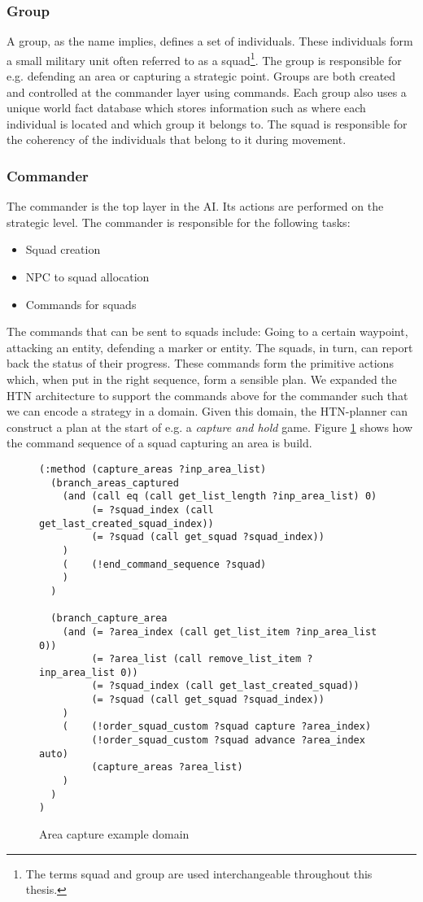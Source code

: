 \subsubsection{Group}
A group, as the name implies, defines a set of individuals. These individuals
form a small military unit often referred to as a squad\footnote{The terms
squad and group are used interchangeable throughout this thesis.}.  The group
is responsible for e.g. defending an area or capturing a strategic point.
Groups are both created and controlled at the commander layer using commands.
Each group also uses a unique world fact database which stores information such
as where each individual is located and which group it belongs to. The squad is
responsible for the coherency of the individuals that belong to it during
movement.
\subsubsection{Commander}
The commander is the top layer in the AI. Its actions are performed on the
strategic level. The commander is responsible for the following tasks:
\begin{itemize}
\item{Squad creation}
\item{NPC to squad allocation}
\item{Commands for squads}
\end{itemize}
The commands that can be sent to squads include: Going to a certain waypoint,
attacking an entity, defending a marker or entity. The squads, in turn, can
report back the status of their progress. These commands form the primitive
actions which, when put in the right sequence, form a sensible plan. We
expanded the HTN architecture to support the commands above for the commander
such that we can encode a strategy in a domain. Given this domain, the
HTN-planner can construct a plan at the start of e.g. a \emph{capture and hold}
game. Figure \ref{fig:ch-example} shows how the command sequence of a squad
capturing an area is build.
\begin{figure}[!ht]
\centering
\begin{verbatim}
(:method (capture_areas ?inp_area_list)
  (branch_areas_captured
    (and (call eq (call get_list_length ?inp_area_list) 0)
         (= ?squad_index (call get_last_created_squad_index))
         (= ?squad (call get_squad ?squad_index))
    )
    (    (!end_command_sequence ?squad)
    )
  )
  
  (branch_capture_area
    (and (= ?area_index (call get_list_item ?inp_area_list 0))
         (= ?area_list (call remove_list_item ?inp_area_list 0))
         (= ?squad_index (call get_last_created_squad))
         (= ?squad (call get_squad ?squad_index))
    )
    (    (!order_squad_custom ?squad capture ?area_index)
         (!order_squad_custom ?squad advance ?area_index auto)
         (capture_areas ?area_list)
    )
  )
)
\end{verbatim}
\caption{Area capture example domain}
\label{fig:ch-example}
\end{figure}
